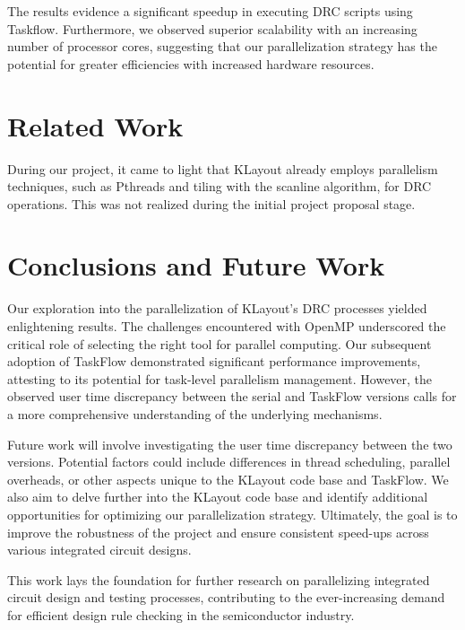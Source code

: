 \documentclass[sigconf]{acmart}
\begin{document}
    The results evidence a significant speedup in executing DRC scripts using Taskflow. Furthermore, we observed superior scalability with an increasing number of processor cores, suggesting that our parallelization strategy has the potential for greater efficiencies with increased hardware resources.
    
    \section{Related Work}
    During our project, it came to light that KLayout already employs parallelism techniques, such as Pthreads and tiling with the scanline algorithm, for DRC operations. This was not realized during the initial project proposal stage.
    
    \section{Conclusions and Future Work}
    Our exploration into the parallelization of KLayout's DRC processes yielded enlightening results. The challenges encountered with OpenMP underscored the critical role of selecting the right tool for parallel computing. Our subsequent adoption of TaskFlow demonstrated significant performance improvements, attesting to its potential for task-level parallelism management. However, the observed user time discrepancy between the serial and TaskFlow versions calls for a more comprehensive understanding of the underlying mechanisms.
  
    Future work will involve investigating the user time discrepancy between the two versions. Potential factors could include differences in thread scheduling, parallel overheads, or other aspects unique to the KLayout code base and TaskFlow. We also aim to delve further into the KLayout code base and identify additional opportunities for optimizing our parallelization strategy. Ultimately, the goal is to improve the robustness of the project and ensure consistent speed-ups across various integrated circuit designs.
  
    This work lays the foundation for further research on parallelizing integrated circuit design and testing processes, contributing to the ever-increasing demand for efficient design rule checking in the semiconductor industry.
    
\end{document}
